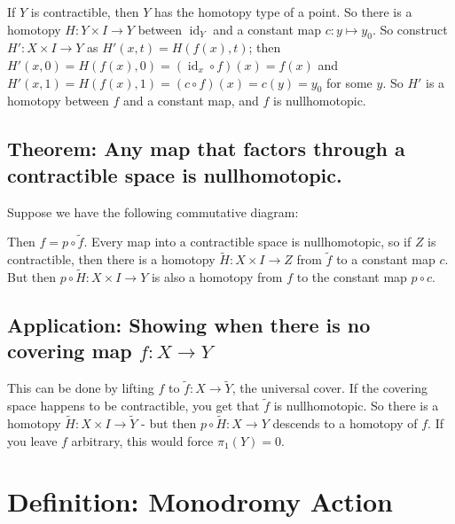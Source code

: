 If \(Y\) is contractible, then \(Y\) has the homotopy type of a point.
So there is a homotopy \(H: Y\times I \to Y\) between
\(\operatorname{id}_Y\) and a constant map \(c: y \mapsto y_0\). So
construct \(H': X\times I \to Y\) as \(H'(x, t) = H(f(x), t)\); then
\(H'(x, 0) = H(f(x), 0) = (\operatorname{id}_x \circ f)(x) = f(x)\) and
\(H'(x, 1) = H(f(x), 1) = (c \circ f)(x) = c(y) = y_0\) for some \(y\).
So \(H'\) is a homotopy between \(f\) and a constant map, and \(f\) is
nullhomotopic.

\hypertarget{theorem-any-map-that-factors-through-a-contractible-space-is-nullhomotopic.}{%
\subsection{Theorem: Any map that factors through a contractible space
is
nullhomotopic.}\label{theorem-any-map-that-factors-through-a-contractible-space-is-nullhomotopic.}}

Suppose we have the following commutative diagram:

Then \(f = p \circ \tilde f\). Every map into a contractible space is
nullhomotopic, so if \(Z\) is contractible, then there is a homotopy
\(\tilde H: X\times I \to Z\) from \(\tilde f\) to a constant map \(c\).
But then \(p\circ \tilde H: X \times I \to Y\) is also a homotopy from
\(f\) to the constant map \(p\circ c\).

\hypertarget{application-showing-when-there-is-no-covering-map-f-x-to-y}{%
\subsection{\texorpdfstring{Application: Showing when there is no
covering map
\(f: X \to Y\)}{Application: Showing when there is no covering map f: X \textbackslash to Y}}\label{application-showing-when-there-is-no-covering-map-f-x-to-y}}

This can be done by lifting \(f\) to \(\tilde f: X \to\tilde Y\), the
universal cover. If the covering space happens to be contractible, you
get that \(\tilde f\) is nullhomotopic. So there is a homotopy
\(\tilde H: X\times I \to\tilde Y\) - but then
\(p\circ\tilde H: X \to Y\) descends to a homotopy of \(f\). If you
leave \(f\) arbitrary, this would force \(\pi_1(Y) = 0\).

\hypertarget{definition-monodromy-action}{%
\section{Definition: Monodromy
Action}\label{definition-monodromy-action}}

